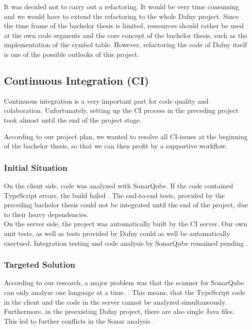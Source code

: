 It was decided not to carry out a refactoring. It would be very time consuming and we would have to extend the refactoring to the whole Dafny project. Since the time frame of the bachelor thesis is limited, ressources should rather be used at the own code segments and the core concept of the bachelor thesis, such as the implementation of the symbol table. However, refactoring the code of Dafny itself is one of the possible outlooks of this project.






\subsection{Continuous Integration (CI)}
Continuous integration is a very important part for code quality and colaboration.
Unfortunately, setting up the CI process in the preceding project\cite{sa} took almost until the end of the project stage.

According to our project plan, we wanted to resolve all CI-issues at the beginning of the bachelor thesis, so that we can then profit by a supportive workflow.

\subsubsection{Initial Situation}
On the client side, code was analyzed with SonarQube. If the code contained TypeScript errors, the build failed \cite{sa}. The end-to-end tests, provided by the preceding bachelor thesis\cite{ba} could not be integrated until the end of the project, due to their heavy dependencies.\\

On the server side, the project was automatically built by the CI server. Our own unit tests, as well as tests provided by Dafny could as well be automatically exectued. Integration testing and code analysis by SonarQube remained pending \cite{sa}.

\subsubsection{Targeted Solution}
According to our research, a major problem was that the scanner for SonarQube can only analyze one language at a time. \cite{sonar-supports-only-one-language}. This means, that the TypeScript code in the client and the \Csharp code in the server cannot be analyzed simultaneously.
Furthermore, in the preexisting Dafny project, there are also single Java files. This led to further conflicts in the Sonar analysis \cite{sa}. \\

